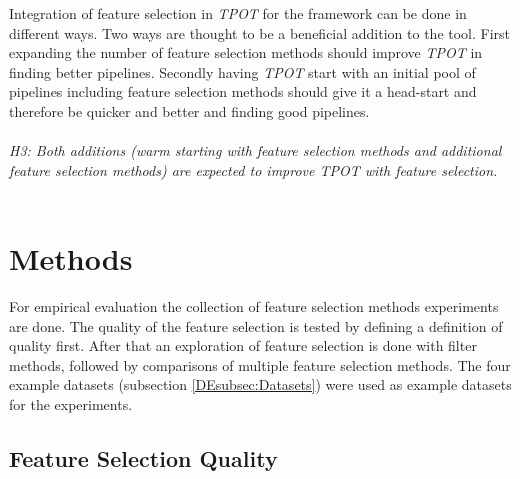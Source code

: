 \documentclass[10pt,a4paper]{report}
\begin{document}
\begin{enumerate}
		Integration of feature selection in \textit{TPOT} for the framework can be done in different ways. Two ways are thought to be a beneficial addition to the tool. First expanding the number of feature selection methods should improve \textit{TPOT} in finding better pipelines. Secondly having \textit{TPOT} start with an initial pool of pipelines including feature selection methods should give it a head-start and therefore be quicker and better and finding good pipelines.\\
		\\
		\emph{H3: Both additions (warm starting with feature selection methods and additional feature selection methods) are expected to improve \textit{TPOT} with feature selection.}\\
		\\
		
				
	\end{enumerate}
	
	\newpage
	\section{Methods}
	\label{FSsec:Methods}
	
	For empirical evaluation the collection of feature selection methods experiments are done. The quality of the feature selection is tested by defining a definition of quality first. After that an exploration of feature selection is done with filter methods, followed by comparisons of multiple feature selection methods. The four example datasets (subsection \ref{DEsubsec:Datasets}) were used as example datasets for the experiments.
	
	\subsection{Feature Selection Quality}
	\label{FSsubsec:DimensionalityReductionQuality}
	
\end{document}
